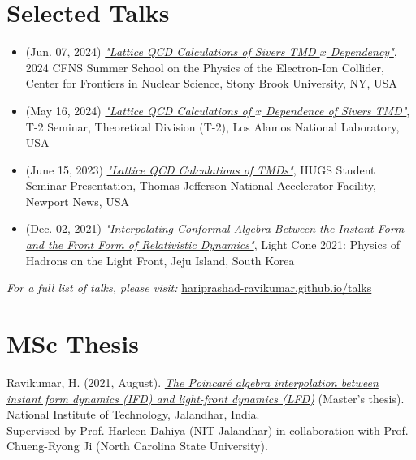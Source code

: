 \documentclass[11pt]{article}
\begin{document}
\section*{Selected Talks}
\vspace{-0.3em}
\begin{itemize}
    \item (Jun. 07, 2024) \href{https://indico.cfnssbu.physics.sunysb.edu/event/111/contributions/1001/attachments/335/552/Lattice_QCD_calculations_of_Sivers_TMD_x_dependance____CFNS_school_presentation_Hari__NMSU_Jun_07_2024.pdf}{\textit{"Lattice QCD Calculations of Sivers TMD $x$ Dependency"}}, 2024 CFNS Summer School on the Physics of the Electron-Ion Collider, Center for Frontiers in Nuclear Science, Stony Brook University, NY, USA
    
    \item (May 16, 2024) \href{https://hariprashad-ravikumar.github.io/talks/Lattice_QCD_calculations_of_Sivers_TMD_x_dependance____presentation_Hari__NMSU_May_16_2024.pdf}{\textit{"Lattice QCD Calculations of $x$ Dependence of Sivers TMD"}}, T-2 Seminar, Theoretical Division (T-2), Los Alamos National Laboratory, USA
    
    \item (June 15, 2023) \href{https://indico.jlab.org/event/717/contributions/12720/attachments/9865/14525/Lattice_QCD_calculations_of_TMDs_HUGS_presentation_Hari_NMSU_Jun_15_2023__updated_%20(1).pdf}{\textit{"Lattice QCD Calculations of TMDs"}}, HUGS Student Seminar Presentation, Thomas Jefferson National Accelerator Facility, Newport News, USA
   
    \item (Dec. 02, 2021) \href{https://indico.global/event/13145/contributions/116043/}{\textit{"Interpolating Conformal Algebra Between the Instant Form and the Front Form of Relativistic Dynamics"}}, Light Cone 2021: Physics of Hadrons on the Light Front, Jeju Island, South Korea
\end{itemize}
\noindent\textit{For a full list of talks, please visit:} \href{https://hariprashad-ravikumar.github.io/talks}{hariprashad-ravikumar.github.io/talks}


\section*{MSc Thesis}
\vspace{-0.3em}
Ravikumar, H. (2021, August). \href{https://hariprashad-ravikumar.github.io/publication_pdfs/The%20Poincare%CC%81%20Algebra%20Interpolation%20between%20Instant%20Form%20Dynamics%20(IFD)%20and%20Light%20Front%20Dynamics%20(LFD)%20(Master's%20thesis).pdf}{\textit{The Poincaré algebra interpolation between instant form dynamics (IFD) and light-front dynamics (LFD)}} (Master's thesis). National Institute of Technology, Jalandhar, India.  \\
Supervised by Prof. Harleen Dahiya (NIT Jalandhar) in collaboration with Prof. Chueng-Ryong Ji (North Carolina State University).
\end{document}
